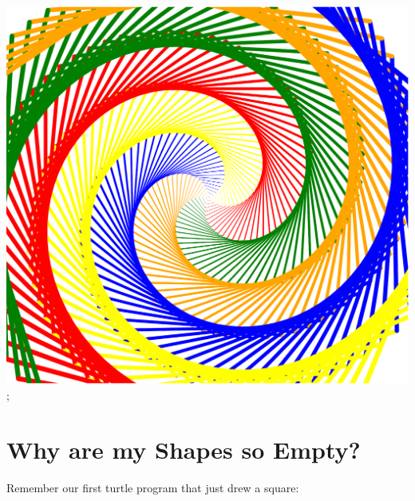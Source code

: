 \documentclass{coderdojo}
\begin{document}
{{	\includegraphics[clip,trim=0 0 0 0, width=\textwidth]{code/Color_Spiral_c.pdf}
	};
}

\clearpage

\section{Why are my Shapes so Empty?}\label{sec:fill}

Remember our first turtle program that just drew a square:

\end{document}
